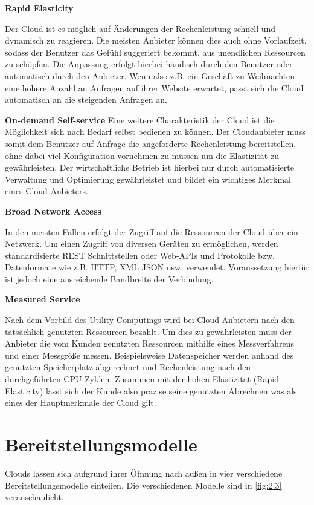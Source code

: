 \textbf{Rapid Elasticity}

Der Cloud ist es möglich auf Änderungen der Rechenleistung schnell und dynamisch zu reagieren. Die meisten Anbieter können dies auch ohne Vorlaufzeit, sodass der Benutzer das Gefühl suggeriert bekommt, aus unendlichen Ressourcen zu schöpfen. Die Anpassung erfolgt hierbei händisch durch den Benutzer oder automatisch durch den Anbieter. Wenn also z.B. ein Geschäft zu Weihnachten eine höhere Anzahl an Anfragen auf ihrer Website erwartet, passt sich die Cloud automatisch an die steigenden Anfragen an. \cite*[]{DAAS}

\textbf{On-demand Self-service}
Eine weitere Charakteristik der Cloud ist die Möglichkeit sich nach Bedarf selbst bedienen  zu können. Der Cloudanbieter muss somit dem Benutzer auf Anfrage die angeforderte Rechenleistung bereitstellen, ohne dabei viel Konfiguration vornehmen zu müssen um die Elastizität zu gewährleisten. Der wirtschaftliche Betrieb ist hierbei nur durch automatisierte Verwaltung und Optimierung gewährleistet und bildet ein wichtiges Merkmal eines Cloud Anbieters. \cite*[]{DAAS}

\textbf{Broad Network Access}

In den meisten Fällen erfolgt der Zugriff auf die Ressourcen der Cloud über ein Netzwerk. Um einen Zugriff von diversen Geräten zu ermöglichen, werden standardisierte REST Schnittstellen oder Web-APIs und Protokolle bzw. Datenformate wie z.B. HTTP, XML JSON usw. verwendet. Voraussetzung hierfür ist jedoch eine ausreichende Bandbreite der Verbindung. \cite*[]{DAAS}

\textbf{Measured Service}

Nach dem Vorbild des Utility Computings wird bei Cloud Anbietern nach den tatsächlich genutzten Ressourcen bezahlt. Um dies zu gewährleisten muss der Anbieter die vom Kunden genutzten Ressourcen mithilfe eines Messverfahrens und einer Messgröße messen. Beispielsweise Datenspeicher werden anhand des genutzten Speicherplatz abgerechnet und Rechenleistung nach den durchgeführten CPU Zyklen. Zusammen mit der hohen Elastizität (Rapid Elasticity) lässt sich der Kunde also präzise seine  genutzten Abrechnen was als eines der Hauptmerkmale der Cloud gilt. \cite*[]{SIGCOMM}

\section{Bereitstellungsmodelle}
Clouds lassen sich aufgrund ihrer Öfnnung nach außen in vier verschiedene Bereitstellungsmodelle einteilen. Die verschiedenen Modelle sind in \autoref{fig:2.3} veranschaulicht.

